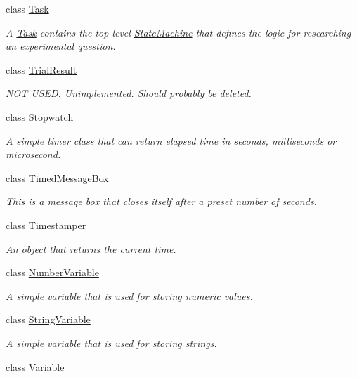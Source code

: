 \begin{DoxyCompactItemize}
class \hyperlink{class_picto_1_1_task}{Task}
\begin{DoxyCompactList}\small\item\em A \hyperlink{class_picto_1_1_task}{Task} contains the top level \hyperlink{class_picto_1_1_state_machine}{State\-Machine} that defines the logic for researching an experimental question. \end{DoxyCompactList}\item 
class \hyperlink{class_picto_1_1_trial_result}{Trial\-Result}
\begin{DoxyCompactList}\small\item\em N\-O\-T U\-S\-E\-D. Unimplemented. Should probably be deleted. \end{DoxyCompactList}\item 
class \hyperlink{class_picto_1_1_stopwatch}{Stopwatch}
\begin{DoxyCompactList}\small\item\em A simple timer class that can return elapsed time in seconds, milliseconds or microsecond. \end{DoxyCompactList}\item 
class \hyperlink{class_picto_1_1_timed_message_box}{Timed\-Message\-Box}
\begin{DoxyCompactList}\small\item\em This is a message box that closes itself after a preset number of seconds. \end{DoxyCompactList}\item 
class \hyperlink{class_picto_1_1_timestamper}{Timestamper}
\begin{DoxyCompactList}\small\item\em An object that returns the current time. \end{DoxyCompactList}\item 
class \hyperlink{class_picto_1_1_number_variable}{Number\-Variable}
\begin{DoxyCompactList}\small\item\em A simple variable that is used for storing numeric values. \end{DoxyCompactList}\item 
class \hyperlink{class_picto_1_1_string_variable}{String\-Variable}
\begin{DoxyCompactList}\small\item\em A simple variable that is used for storing strings. \end{DoxyCompactList}\item 
class \hyperlink{class_picto_1_1_variable}{Variable}

\end{DoxyCompactItemize}
